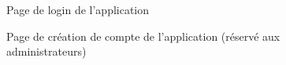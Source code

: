 \documentclass[a4paper, 12pt]{article}
\begin{document}
\begin{figure}
    \begin{center}
    \end{center}
    \caption{Page de login de l'application}
\end{figure}
\begin{figure}
    \begin{center}
    \end{center}
    \caption{Page de création de compte de l'application (réservé aux administrateurs)}
\end{figure}
\end{document}
